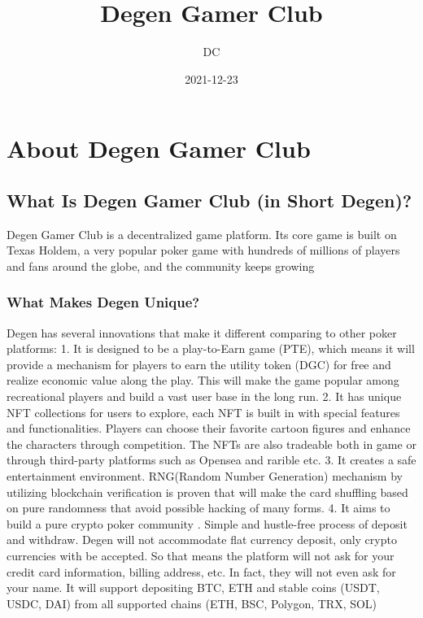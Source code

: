 \documentclass[
]{book}
\title{Degen Gamer Club}
\author{DC}
\date{2021-12-23}
\begin{document}
\maketitle

{
\setcounter{tocdepth}{1}
\tableofcontents
}
\hypertarget{about-degen-gamer-club}{%
\chapter{About Degen Gamer Club}\label{about-degen-gamer-club}}

\hypertarget{what-is-degen-gamer-club-in-short-degen}{%
\section{What Is Degen Gamer Club (in Short Degen)?}\label{what-is-degen-gamer-club-in-short-degen}}

Degen Gamer Club is a decentralized game platform. Its core game is built on Texas Holdem, a very popular poker game with hundreds of millions of players and fans around the globe, and the community keeps growing

\hypertarget{what-makes-degen-unique}{%
\subsection{What Makes Degen Unique?}\label{what-makes-degen-unique}}

Degen has several innovations that make it different comparing to other poker platforms:
1. It is designed to be a play-to-Earn game (PTE), which means it will provide a mechanism for players to earn the utility token (DGC) for free and realize economic value along the play. This will make the game popular among recreational players and build a vast user base in the long run.
2. It has unique NFT collections for users to explore, each NFT is built in with special features and functionalities. Players can choose their favorite cartoon figures and enhance the characters through competition. The NFTs are also tradeable both in game or through third-party platforms such as Opensea and rarible etc.
3. It creates a safe entertainment environment. RNG(Random Number Generation) mechanism by utilizing blockchain verification is proven that will make the card shuffling based on pure randomness that avoid possible hacking of many forms.
4. It aims to build a pure crypto poker community . Simple and hustle-free process of deposit and withdraw. Degen will not accommodate flat currency deposit, only crypto currencies with be accepted. So that means the platform will not ask for your credit card information, billing address, etc. In fact, they will not even ask for your name. It will support depositing BTC, ETH and stable coins (USDT, USDC, DAI) from all supported chains (ETH, BSC, Polygon, TRX, SOL)
\end{document}
